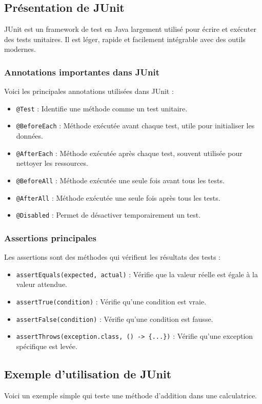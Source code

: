 \documentclass[12pt,a4paper]{article}
\begin{document}
\subsection{Présentation de JUnit}
JUnit est un framework de test en Java largement utilisé pour écrire et exécuter des tests unitaires. Il est léger, rapide et facilement intégrable avec des outils modernes.

\subsubsection{Annotations importantes dans JUnit}
Voici les principales annotations utilisées dans JUnit :
\begin{itemize}
    \item \texttt{@Test} : Identifie une méthode comme un test unitaire.
    \item \texttt{@BeforeEach} : Méthode exécutée avant chaque test, utile pour initialiser les données.
    \item \texttt{@AfterEach} : Méthode exécutée après chaque test, souvent utilisée pour nettoyer les ressources.
    \item \texttt{@BeforeAll} : Méthode exécutée une seule fois avant tous les tests.
    \item \texttt{@AfterAll} : Méthode exécutée une seule fois après tous les tests.
    \item \texttt{@Disabled} : Permet de désactiver temporairement un test.
\end{itemize}

\subsubsection{Assertions principales}
Les assertions sont des méthodes qui vérifient les résultats des tests :
\begin{itemize}
    \item \texttt{assertEquals(expected, actual)} : Vérifie que la valeur réelle est égale à la valeur attendue.
    \item \texttt{assertTrue(condition)} : Vérifie qu'une condition est vraie.
    \item \texttt{assertFalse(condition)} : Vérifie qu'une condition est fausse.
    \item \texttt{assertThrows(exception.class, () -> \{...\})} : Vérifie qu'une exception spécifique est levée.
\end{itemize}

\subsection{Exemple d'utilisation de JUnit}
Voici un exemple simple qui teste une méthode d'addition dans une calculatrice.
\end{document}
